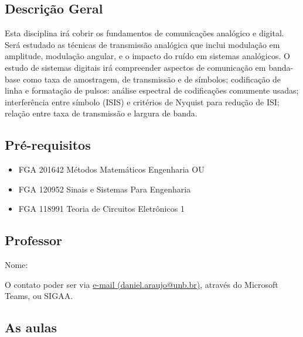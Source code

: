   \begin{snugshade}
  \section{Descrição Geral}
  \end{snugshade}
  
 Esta disciplina irá cobrir os fundamentos de comunicações analógico e digital. Será estudado as técnicas de transmissão analógica que inclui modulação em amplitude, modulação angular, e o impacto do ruído em sistemas analógicos. O estudo de sistemas digitais irá compreender aspectos de comunicação em banda-base como taxa de amostragem, de transmissão e de símbolos; codificação de linha e formatação de pulsos: análise espectral de codificações comumente usadas; interferência entre símbolo (ISIS) e critérios de Nyquist para redução de ISI; relação entre taxa de transmissão e largura de banda. 
  

  
  \begin{snugshade}
  \section{Pré-requisitos} 
  \end{snugshade}
  
  \begin{itemize}
      \item FGA 201642 Métodos Matemáticos Engenharia OU \item FGA 120952 Sinais e Sistemas Para Engenharia 
      \item FGA 118991 Teoria de Circuitos Eletrônicos 1
  \end{itemize}
    
  \begin{snugshade}
  \section{Professor}
  \end{snugshade}
  Nome: \professores

   O contato poder ser via  \href{mailto:daniel.araujo@unb.br}{e-mail (daniel.araujo@unb.br)}, através do Microsoft Teams, ou SIGAA. 


  \begin{snugshade}
  \section{As aulas} %
  \end{snugshade}


